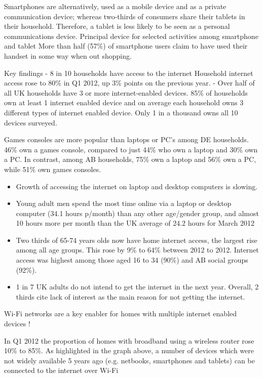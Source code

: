 \documentclass[letterpaper,10pt,openany,oneside,english]{sphinxmanual}
\begin{document}
Smartphones are alternatively, used as a mobile device and as a private communication device; whereas two-thirds of consumers share their tablets in their household. Therefore, a tablet is less likely to be seen as a personal communications device. Principal device for selected activities among smartphone and tablet More than half (57\%) of smartphone users claim to have used their handset in some way when out shopping.

Key findings
- 8 in 10 households have access to the internet Household internet access rose to 80\% in Q1 2012, up 3\% points on the previous year.
- Over half of all UK households have 3 or more internet-enabled devices. 85\% of households own at least 1 internet enabled device and on average each household owns 3 different types of internet enabled device. Only 1 in a thousand owns all 10 devices surveyed.

Games consoles are more popular than laptops or PC’s among DE households. 46\% own a games console, compared to just 44\% who own a laptop and 30\% own a PC. In contrast, among AB households, 75\% own a laptop and 56\% own a PC, while 51\% own games consoles.
\begin{itemize}
\item {} 
Growth of accessing the internet on laptop and desktop computers is slowing.

\item {} 
Young adult men spend the most time online via a laptop or desktop computer (34.1 hours p/month) than any other age/gender group, and almost 10 hours more per month than the UK average of 24.2 hours for March 2012

\item {} 
Two thirds of 65-74 years olds now have home internet access, the largest rise among all age groups. This rose by 9\% to 64\% between 2012 to 2012. Internet access was highest among those aged 16 to 34 (90\%) and AB social groups (92\%).

\item {} 
1 in 7 UK adults do not intend to get the internet in the next year. Overall, 2 thirds cite lack of interest as the main reason for not getting the internet.

\end{itemize}

Wi-Fi networks are a key enabler for homes with multiple internet enabled devices !

In Q1 2012 the proportion of homes with broadband using a wireless router rose 10\% to 85\%. As highlighted in the graph above, a number of devices which were not widely available 5 years ago (e.g. netbooks, smartphones and tablets) can be connected to the internet over Wi-Fi
\end{document}
